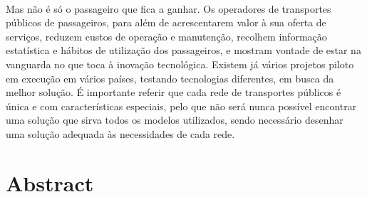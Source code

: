 \\Mas não é só o passageiro que fica a ganhar. Os operadores de transportes públicos de passageiros, para além de acrescentarem valor à sua oferta de serviços, reduzem custos de operação e manutenção, recolhem informação estatística e hábitos de utilização dos passageiros, e mostram vontade de estar na vanguarda no que toca à inovação tecnológica. Existem já vários projetos piloto em execução em vários países, testando tecnologias diferentes, em busca da melhor solução. É importante referir que cada rede de transportes públicos é única e com características especiais, pelo que não será nunca possível encontrar uma solução que sirva todos os modelos utilizados, sendo necessário desenhar uma solução adequada às necessidades de cada rede.

\chapter*{Abstract}

